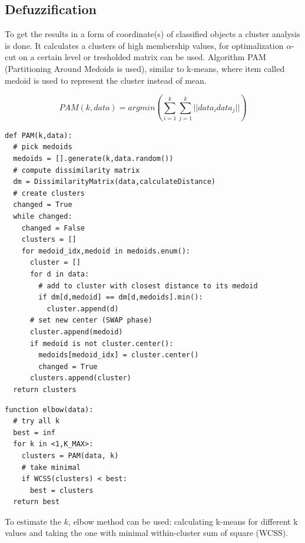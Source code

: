 
\subsection*{Defuzzification}

To get the results in a form of coordinate(s) of classified objects a cluster analysis is done. It calculates
a clusters of high membership values, for optimalization $\alpha$-cut on a certain level or tresholded
matrix can be used. Algorithm PAM (Partitioning Around Medoids is used), similar to k-means, where item called
medoid is used to represent the cluster instead of mean.

\begin{equation}
\mathit{PAM}(k, data) = argmin \left( \sum_{i=1}^{k} \sum_{j=1}^{k} ||data_{i} data_{j}||  \right)
\end{equation}

\begin{lstlisting}[style=python]
def PAM(k,data):
  # pick medoids
  medoids = [].generate(k,data.random())
  # compute dissimilarity matrix
  dm = DissimilarityMatrix(data,calculateDistance)
  # create clusters
  changed = True
  while changed:
    changed = False
    clusters = []
    for medoid_idx,medoid in medoids.enum():
      cluster = []
      for d in data:
        # add to cluster with closest distance to its medoid
        if dm[d,medoid] == dm[d,medoids].min():
          cluster.append(d)
      # set new center (SWAP phase)
      cluster.append(medoid)
      if medoid is not cluster.center():
        medoids[medoid_idx] = cluster.center()
        changed = True
      clusters.append(cluster)
  return clusters
\end{lstlisting}

\begin{lstlisting}[style=python]
function elbow(data):
  # try all k
  best = inf
  for k in <1,K_MAX>:
    clusters = PAM(data, k)
    # take minimal
    if WCSS(clusters) < best:
      best = clusters
  return best
\end{lstlisting}

To estimate the $k$, elbow method can be used: calculating k-means for different k values and taking the one with
minimal within-cluster sum of square (WCSS).\cite{ClusterAnalysis} \cite{VagueNatureInformation}

